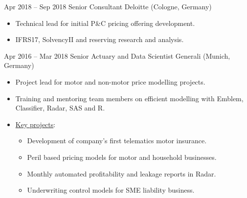 \documentclass[a4paper,]{fortysecondscv}
\begin{document}
\begin{cvtable}
{\begin{itemize}[nosep, leftmargin=0pt]
        \end{itemize}
    }
    \vspace{\topsep}
    \cvitem
    {Apr 2018 -- Sep 2018}
    {Senior Consultant}
    {Deloitte (Cologne, Germany)}
    {
        \vspace{-\topsep}
        \begin{itemize}[nosep, leftmargin=0pt] %
            \item Technical lead for initial P\&C pricing offering development.
            \item IFRS17, SolvencyII and reserving research and analysis.
        \end{itemize}
    }
    \vspace{\topsep}
    \cvitem
    {Apr 2016 -- Mar 2018}
    {Senior Actuary and Data Scientist}
    {Generali (Munich, Germany)}
    {
        \vspace{-\topsep}
        \begin{itemize}[nosep, leftmargin=0pt] %
            \item Project lead for motor and non-motor price modelling projects.
            \item Training and mentoring team members on efficient modelling with Emblem, Classifier, Radar, SAS and R.
            \item \underline{Key projects}:
                  \begin{itemize}
                      \item Development of company's first telematics motor insurance.
                      \item Peril based pricing models for motor and household businesses.
                      \item Monthly automated profitability and leakage reports in Radar.
                      \item Underwriting control models for SME liability business.

\end{itemize}
\end{itemize}}
\end{cvtable}
\end{document}

